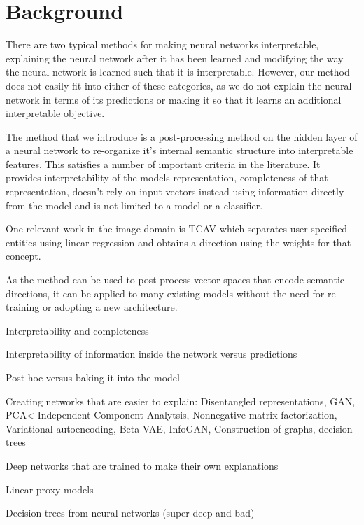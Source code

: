 

\section{Background}

There are two typical methods for making neural networks interpretable, explaining the neural network after it has been learned and modifying the way the neural network is learned such that it is interpretable. However, our method does not easily fit into either of these categories, as we do not explain the neural network in terms of its predictions or making it so that it learns an additional interpretable objective.

The method that we introduce is a post-processing method on the hidden layer of a neural network to re-organize it's internal semantic structure into interpretable features. This satisfies a number of important criteria in the literature. It provides interpretability of the models representation, completeness of that representation, doesn't rely on input vectors instead using information directly from the model and is not limited to a model or a classifier. 

One relevant work in the image domain is TCAV which separates user-specified entities using linear regression and obtains a direction using the weights for that concept. 

As the method can be used to post-process vector spaces that encode semantic directions, it can be applied to many existing models without the need for re-training or adopting a new architecture. 

Interpretability and completeness

Interpretability of information inside the network versus predictions


Post-hoc versus baking it into the model

Creating networks that are easier to explain:  Disentangled representations, GAN, PCA< Independent Component Analytsis, Nonnegative matrix factorization, Variational autoencoding, Beta-VAE, InfoGAN, Construction of graphs, decision trees

Deep networks that are trained to make their own explanations 

Linear proxy models

Decision trees from neural networks  (super deep and bad)

